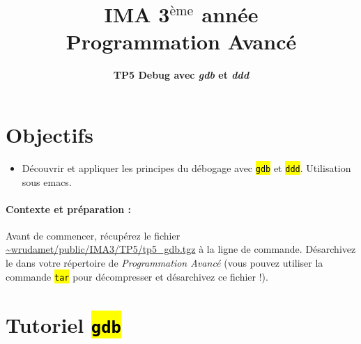 \documentclass[final, pdftex, a4paper, openbib, ]{article}
\title{IMA 3$^{\mbox{\`eme}}$ année\\ Programmation Avancé
}
\author{\huge \textbf{TP5 Debug avec \textit{gdb} et \textit{ddd}}}
\date{}
\let\OldTexttt\texttt
\renewcommand{\texttt}[1]{\OldTexttt{\hl{#1}}}
\begin{document}
\posttitle{\par\end{center}}
\setlength{\droptitle}{-45pt}
\maketitle

\vspace{-1.7cm}
\section{Objectifs}

\begin{itemize}
	\item Découvrir et appliquer les principes du débogage avec \texttt{gdb} et \texttt{ddd}. Utilisation sous emacs.
\end{itemize}


\paragraph{Contexte et préparation : } Avant de commencer, récupérez le fichier \url{~wrudamet/public/IMA3/TP5/tp5_gdb.tgz} à la ligne de commande. Désarchivez le dans votre répertoire de \textit{Programmation Avancé} (vous pouvez utiliser la commande \texttt{tar} pour décompresser et désarchivez ce fichier !).



\section{Tutoriel \texttt{gdb}}
\end{document}
